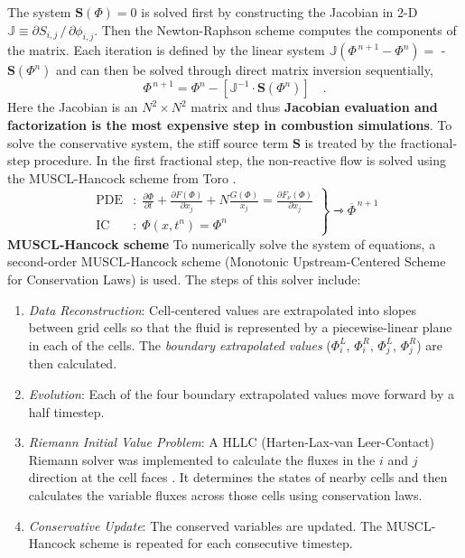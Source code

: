 \documentclass[letterpaper,twocolumn,10pt]{article}
\begin{document}
The system $\mathbf{S}(\Phi) = 0$ is solved first by constructing the Jacobian in 2-D $\mathbb{J} \equiv \partial S_{i,j} \, / \, \partial \phi_{i,j}$. Then the Newton-Raphson scheme computes the components of the matrix. Each iteration is defined by the linear system $\mathbb{J}(\Phi^{\, n+1} - \Phi^n) = $ -$ \mathbf{S}(\Phi^n)$ and can then be solved through direct matrix inversion sequentially,
$$ \Phi^{\, n+1} = \Phi^n - [\mathbb{J}^{-1} \cdot \mathbf{S}(\Phi^n)] \quad \textrm{.} $$
Here the Jacobian is an $N^2 \times N^2$ matrix and thus \textbf{Jacobian evaluation and factorization is the most expensive step in combustion simulations}. To solve the conservative system, the stiff source term $\textbf{S}$ is treated by the fractional-step procedure. In the first fractional step, the non-reactive flow is solved using the MUSCL-Hancock scheme from Toro \cite{Toro2009}.
\begin{equation*}
    \left.
    \begin{aligned}
        \textrm{PDE}&: \; \frac{\partial \Phi}{\partial t} + \frac{\partial F (\Phi)}{\partial x_j} + N \frac{G (\Phi)}{x_j} = \frac{\partial F_\nu (\Phi)}{\partial x_j} \\
        \textrm{IC}&: \; \Phi(x, t^n) = \Phi^n
    \end{aligned}
    \right\} \rightarrowtriangle \overline{\Phi}^{\, n+1}
\end{equation*}
\noindent \textbf{MUSCL-Hancock scheme} To numerically solve the system of equations, a second-order MUSCL-Hancock scheme (Monotonic Upstream-Centered Scheme for Conservation Laws) is used. The steps of this solver include:
\begin{enumerate}
    \item \emph{Data Reconstruction}: Cell-centered values are extrapolated into slopes between grid cells so that the fluid is represented by a piecewise-linear plane in each of the cells. The \emph{boundary extrapolated values} ($\Phi_i^L, \, \Phi_i^R, \, \Phi_j^L, \, \Phi_j^R$) are then calculated.
    \item \emph{Evolution}: Each of the four boundary extrapolated values move forward by a half timestep.
    \item \emph{Riemann Initial Value Problem}: A HLLC (Harten-Lax-van Leer-Contact) Riemann solver was implemented to calculate the fluxes in the $i$ and $j$ direction at the cell faces \cite{Toro2009}. It determines the states of nearby cells and then calculates the variable fluxes across those cells using conservation laws.
    \item \emph{Conservative Update}: The conserved variables are updated. The MUSCL-Hancock scheme is repeated for each consecutive timestep.
\end{enumerate}
\end{document}
